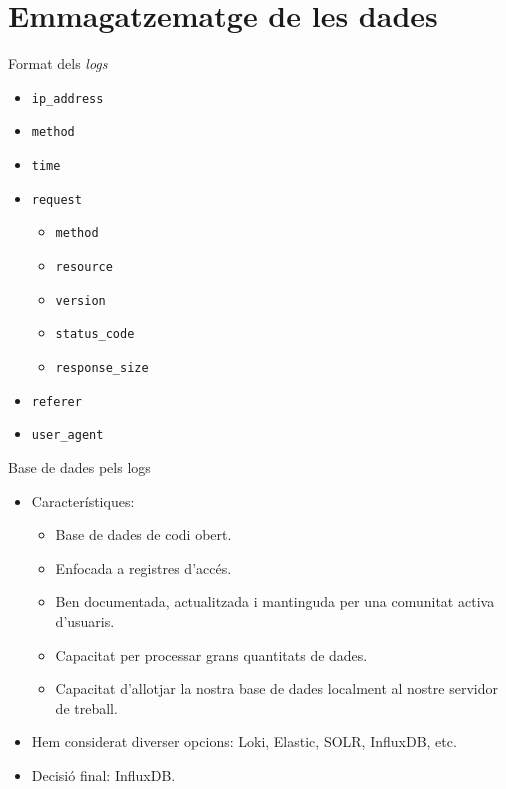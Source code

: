 \section{Emmagatzematge de les dades}\label{sec:data-storing}

\begin{frame}{Format dels \textit{logs}}
    \begin{itemize}
        \item \texttt{ip\_address}
        \item \texttt{method}
        \item \texttt{time}
        \item \texttt{request}
        \begin{itemize}
            \item \texttt{method}
            \item \texttt{resource}
            \item \texttt{version}
            \item \texttt{status\_code}
            \item \texttt{response\_size}
        \end{itemize}
        \item \texttt{referer}
        \item \texttt{user\_agent}
    \end{itemize}
\end{frame}


\begin{frame}{Base de dades pels logs}
    \begin{itemize}%
        \item Característiques:
        \begin{itemize}
            \item Base de dades de codi obert.
            \item Enfocada a registres d'accés.
            \item Ben documentada, actualitzada i mantinguda per una comunitat activa d'usuaris.
            \item Capacitat per processar grans quantitats de dades.
            \item Capacitat d'allotjar la nostra base de dades localment al nostre servidor de treball.
        \end{itemize}
        \item Hem considerat diverser opcions: Loki, Elastic, SOLR, InfluxDB, etc.
        \item Decisió final: InfluxDB.
    \end{itemize}
\end{frame}


